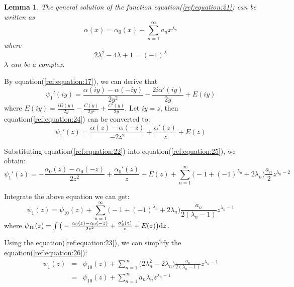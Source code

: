 \documentclass[a4paper]{article}      %
\begin{document}
\newtheorem{lemma}[theorem]{Lemma}
\begin{lemma}\label{lemma 1}
    The general solution of the function equation(\textnormal{\ref{ref:equation:21}}) can be written as
    \begin{equation}\label{ref:equation:22}                                     %
    \alpha(x)=\alpha_0(x)+\sum_{n=1}^{\infty}a_n x^{\lambda_n}
    \end{equation}
where
    \begin{equation}\label{ref:equation:23}                                     %
    2\lambda^2-4\lambda+1=(-1)^\lambda
    \end{equation}
$\lambda$ can be a complex.
\end{lemma}

By equation(\ref{ref:equation:17}), we can derive that
\begin{equation}\label{ref:equation:24}
\psi_{1}'(iy)=\frac{\alpha(iy)-\alpha(-iy)}{2y^2}-\frac{2i\alpha'(iy)}{2y}+E(iy)
\end{equation}
where $E(iy)=\frac{iD(y)}{2y}-\frac{C(y)}{2y^2}+\frac{C'(y)}{2y}$.
Let $iy=z$, then equation(\ref{ref:equation:24}) can be converted to:
\begin{equation}\label{ref:equation:25}
\psi_{1}'(z)=\frac{\alpha(z)-\alpha(-z)}{-2z^2}+\frac{\alpha'(z)}{z}+E(z)
\end{equation}

Substituting equation(\ref{ref:equation:22}) into equation(\ref{ref:equation:25}), we obtain:
$$\psi_{1}'(z)=-\frac{\alpha_0(z)-\alpha_0(-z)}{2z^2}+\frac{\alpha_{0}'(z)}{z}+E(z)+\sum_{n=1}^{\infty}{\big(-1+(-1)^{\lambda_n}+2\lambda_n\big)\frac{a_n}{2} z^{\lambda_n -2}}$$

Integrate the above equation we can get:
\begin{equation}\label{ref:equation:26}
\psi_1(z)=\psi_{10}(z)+\sum_{n=1}^{\infty}{\big(-1+(-1)^{\lambda_n}+2\lambda_n\big)\frac{a_n}{2(\lambda_n -1)} z^{\lambda_n -1}}
\end{equation}
where $\psi_{10}(z)=\int\big(-\frac{\alpha_0(z)-\alpha_0(-z)}{2z^2}+\frac{\alpha_{0}'(z)}{z}+E(z)\big){\rm d}z$.

Using the equation(\ref{ref:equation:23}), we can simplify the equation(\ref{ref:equation:26}):
\begin{eqnarray}
  \psi_1(z) &=& \psi_{10}(z)+\sum_{n=1}^{\infty}{\big(2\lambda_n^2-2\lambda_n\big)\frac{a_n}{2(\lambda_n -1)} z^{\lambda_n -1}}\nonumber\\
  &=& \psi_{10}(z)+\sum_{n=1}^{\infty}{a_n \lambda_n z^{\lambda_n -1}} \label{ref:equation:27}
\end{eqnarray}
\end{document}

